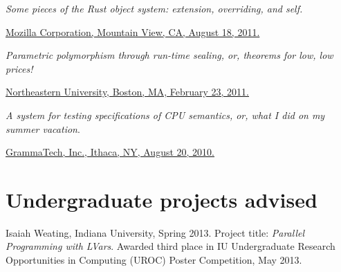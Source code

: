 \documentclass[10pt,letterpaper]{article}
\newenvironment{itemize*}
  {\begin{itemize}
      \setlength{\itemsep}{1pt}
      \setlength{\parskip}{3pt}
  }
  {\end{itemize}}
\begin{document}
\begin{itemize*}
\item
  \emph{Some pieces of the Rust object system: extension, overriding,
    and self.}
  \begin{itemize*}
    \item
      \href{http://www.cs.indiana.edu/~lkuper/talks/rust-objects/rust-objects.pdf}{Mozilla
        Corporation, Mountain View, CA, August 18, 2011.}
  \end{itemize*}

\item
  \emph{Parametric
      polymorphism through run-time sealing, or, theorems for low, low
      prices!}
  \begin{itemize*}
    \item
      \href{http://www.cs.indiana.edu/~lkuper/talks/multilang-param/multilang-param-northeastern.pdf}{Northeastern University, Boston, MA, February 23,
        2011.}
  \end{itemize*}

\item \emph{A system for testing specifications of CPU semantics, or,
  what I did on my summer vacation}.
  \begin{itemize*}
    \item \href{http://www.cs.indiana.edu/~lkuper/talks/tsl-validator/tsl-validator.pdf}{GrammaTech, Inc., Ithaca, NY, August 20, 2010.}
  \end{itemize*}


\end{itemize*}

\section*{Undergraduate projects advised}
\begin{itemize*}
\item Isaiah Weating, Indiana University, Spring 2013.  Project title:
  \emph{Parallel Programming with LVars}.  Awarded third place in IU
  Undergraduate Research Opportunities in Computing (UROC) Poster
  Competition, May 2013.
\end{itemize*}
\end{document}
